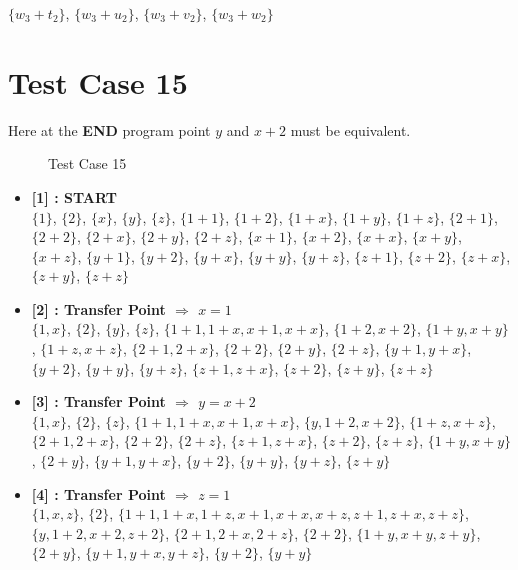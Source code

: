 \begin{itemize}
$\{w_3 + t_2\}$, $\{w_3 + u_2\}$, $\{w_3 + v_2\}$, $\{w_3 + w_2\}$

\end{itemize}

\section{Test Case 15}
\label{sec:tc15}
Here at the \textbf{END} program point $y$ and $x + 2$ must be equivalent.

\begin{figure}[H]
\label{fig:tc15}
    \caption{Test Case 15}
\end{figure}

\begin{itemize}

    \item \textbf{[1] : START}\\
        $\{1\}$, $\{2\}$, $\{x\}$, $\{y\}$, $\{z\}$, $\{1 + 1\}$, $\{1 + 2\}$, $\{1 + x\}$, $\{1 + y\}$, $\{1 + z\}$, $\{2 + 1\}$, $\{2 + 2\}$, $\{2 + x\}$, $\{2 + y\}$, $\{2 + z\}$, $\{x + 1\}$, $\{x + 2\}$, $\{x + x\}$, $\{x + y\}$, $\{x + z\}$, $\{y + 1\}$, $\{y + 2\}$, $\{y + x\}$, $\{y + y\}$, $\{y + z\}$, $\{z + 1\}$, $\{z + 2\}$, $\{z + x\}$, $\{z + y\}$, $\{z + z\}$

    \item \textbf{[2] : Transfer Point $\Rightarrow$ $x = 1$}\\
        $\{1, x\}$, $\{2\}$, $\{y\}$, $\{z\}$, $\{1 + 1, 1 + x, x + 1, x + x\}$, $\{1 + 2, x + 2\}$, $\{1 + y, x + y\}$, $\{1 + z, x + z\}$, $\{2 + 1, 2 + x\}$, $\{2 + 2\}$, $\{2 + y\}$, $\{2 + z\}$, $\{y + 1, y + x\}$, $\{y + 2\}$, $\{y + y\}$, $\{y + z\}$, $\{z + 1, z + x\}$, $\{z + 2\}$, $\{z + y\}$, $\{z + z\}$

    \item \textbf{[3] : Transfer Point $\Rightarrow$ $y = x + 2$}\\
        $\{1, x\}$, $\{2\}$, $\{z\}$, $\{1 + 1, 1 + x, x + 1, x + x\}$, $\{y, 1 + 2, x + 2\}$, $\{1 + z, x + z\}$, $\{2 + 1, 2 + x\}$, $\{2 + 2\}$, $\{2 + z\}$, $\{z + 1, z + x\}$, $\{z + 2\}$, $\{z + z\}$, $\{1 + y, x + y\}$, $\{2 + y\}$, $\{y + 1, y + x\}$, $\{y + 2\}$, $\{y + y\}$, $\{y + z\}$, $\{z + y\}$

    \item \textbf{[4] : Transfer Point $\Rightarrow$ $z = 1$}\\
        $\{1, x, z\}$, $\{2\}$, $\{1 + 1, 1 + x, 1 + z, x + 1, x + x, x + z, z + 1, z + x, z + z\}$, $\{y, 1 + 2, x + 2, z + 2\}$, $\{2 + 1, 2 + x, 2 + z\}$, $\{2 + 2\}$, $\{1 + y, x + y, z + y\}$, $\{2 + y\}$, $\{y + 1, y + x, y + z\}$, $\{y + 2\}$, $\{y + y\}$


\end{itemize}
